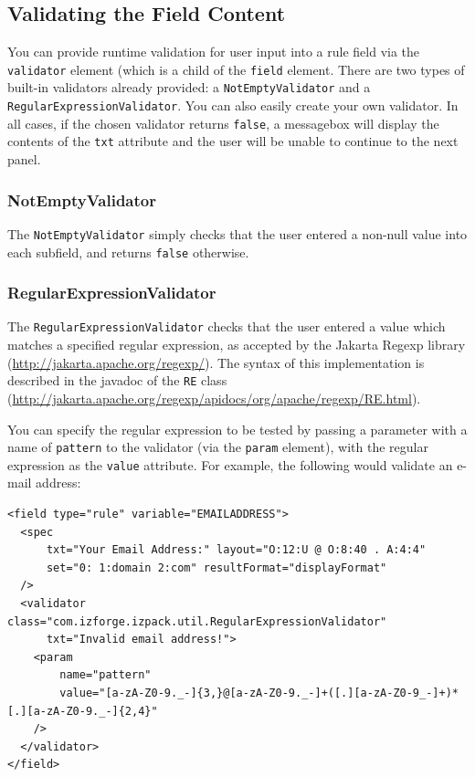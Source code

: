 \subsection{Validating the Field Content}

You can provide runtime validation for user input into a rule field via the 
\texttt{validator} element (which is a child of the \texttt{field} element.  
There are two types of built-in validators already provided: a 
\texttt{NotEmptyValidator} and a \texttt{RegularExpressionValidator}.  You can
 also easily create your own validator.  In all cases, if the chosen validator
 returns \texttt{false}, a messagebox will display the contents of the 
\texttt{txt} attribute and the user will be unable to continue to the next panel.\\

\subsubsection{\textbf{NotEmptyValidator}}

The \texttt{NotEmptyValidator} simply checks that the user entered a non-null 
value into each subfield, and returns \texttt{false} otherwise.\\

\subsubsection{\textbf{RegularExpressionValidator}}

The \texttt{RegularExpressionValidator} checks that the user entered a 
value which matches a specified regular expression, as accepted by the Jakarta
Regexp library 
(\url{http://jakarta.apache.org/regexp/}).  The syntax of this implementation
is described in the javadoc of the \texttt{RE} class 
(\url{http://jakarta.apache.org/regexp/apidocs/org/apache/regexp/RE.html}).

You can specify the regular 
expression to be tested by passing a parameter with a name of \texttt{pattern} 
to the validator (via the \texttt{param} element), with the regular expression
as the \texttt{value} attribute.  For example, the following would validate 
an e-mail address:\\

\footnotesize
\begin{verbatim}
<field type="rule" variable="EMAILADDRESS"> 
  <spec 
      txt="Your Email Address:" layout="O:12:U @ O:8:40 . A:4:4" 
      set="0: 1:domain 2:com" resultFormat="displayFormat"
  />
  <validator class="com.izforge.izpack.util.RegularExpressionValidator" 
      txt="Invalid email address!">
    <param 
        name="pattern" 
        value="[a-zA-Z0-9._-]{3,}@[a-zA-Z0-9._-]+([.][a-zA-Z0-9_-]+)*[.][a-zA-Z0-9._-]{2,4}"
    />
  </validator> 
</field>
\end{verbatim}
\normalsize

